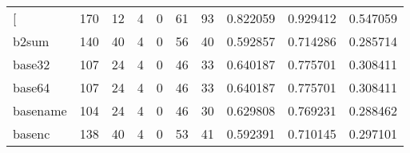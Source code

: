 \begin{longtable}{lrrrrrrrrr}
\bottomrule
\endlastfoot
{[}         &                                                170 &                                                 12 &                                                  4 &                                                  0 &                                                 61 &                                                 93 &                                           0.822059 &                               0.929412 &                             0.547059 \\
b2sum     &                                                140 &                                                 40 &                                                  4 &                                                  0 &                                                 56 &                                                 40 &                                           0.592857 &                               0.714286 &                             0.285714 \\
base32    &                                                107 &                                                 24 &                                                  4 &                                                  0 &                                                 46 &                                                 33 &                                           0.640187 &                               0.775701 &                             0.308411 \\
base64    &                                                107 &                                                 24 &                                                  4 &                                                  0 &                                                 46 &                                                 33 &                                           0.640187 &                               0.775701 &                             0.308411 \\
basename  &                                                104 &                                                 24 &                                                  4 &                                                  0 &                                                 46 &                                                 30 &                                           0.629808 &                               0.769231 &                             0.288462 \\
basenc    &                                                138 &                                                 40 &                                                  4 &                                                  0 &                                                 53 &                                                 41 &                                           0.592391 &                               0.710145 &                             0.297101 \\

\end{longtable}
